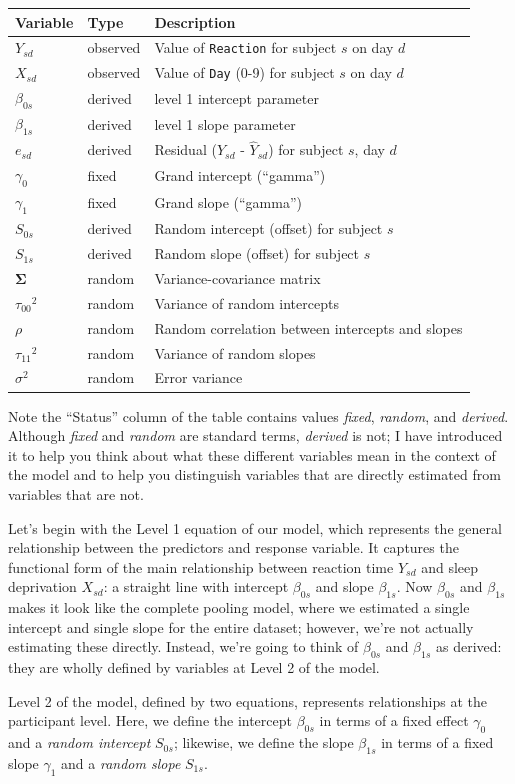 \documentclass[]{book}
\begin{document}
\begin{longtable}[]{@{}lll@{}}
\toprule
Variable & Type & Description\tabularnewline
\midrule
\endhead
\(Y_{sd}\) & observed & Value of \texttt{Reaction} for subject \(s\) on day \(d\)\tabularnewline
\(X_{sd}\) & observed & Value of \texttt{Day} (0-9) for subject \(s\) on day \(d\)\tabularnewline
\(\beta_{0s}\) & derived & level 1 intercept parameter\tabularnewline
\(\beta_{1s}\) & derived & level 1 slope parameter\tabularnewline
\(e_{sd}\) & derived & Residual (\(Y_{sd}\) - \(\hat{Y}_{sd}\)) for subject \(s\), day \(d\)\tabularnewline
\(\gamma_0\) & fixed & Grand intercept (``gamma'')\tabularnewline
\(\gamma_1\) & fixed & Grand slope (``gamma'')\tabularnewline
\(S_{0s}\) & derived & Random intercept (offset) for subject \(s\)\tabularnewline
\(S_{1s}\) & derived & Random slope (offset) for subject \(s\)\tabularnewline
\(\mathbf{\Sigma}\) & random & Variance-covariance matrix\tabularnewline
\({\tau_{00}}^2\) & random & Variance of random intercepts\tabularnewline
\(\rho\) & random & Random correlation between intercepts and slopes\tabularnewline
\({\tau_{11}}^2\) & random & Variance of random slopes\tabularnewline
\(\sigma^2\) & random & Error variance\tabularnewline
\bottomrule
\end{longtable}

Note the ``Status'' column of the table contains values \emph{fixed}, \emph{random}, and \emph{derived}. Although \emph{fixed} and \emph{random} are standard terms, \emph{derived} is not; I have introduced it to help you think about what these different variables mean in the context of the model and to help you distinguish variables that are directly estimated from variables that are not.

Let's begin with the Level 1 equation of our model, which represents the general relationship between the predictors and response variable. It captures the functional form of the main relationship between reaction time \(Y_{sd}\) and sleep deprivation \(X_{sd}\): a straight line with intercept \(\beta_{0s}\) and slope \(\beta_{1s}\). Now \(\beta_{0s}\) and \(\beta_{1s}\) makes it look like the complete pooling model, where we estimated a single intercept and single slope for the entire dataset; however, we're not actually estimating these directly. Instead, we're going to think of \(\beta_{0s}\) and \(\beta_{1s}\) as derived: they are wholly defined by variables at Level 2 of the model.

Level 2 of the model, defined by two equations, represents relationships at the participant level. Here, we define the intercept \(\beta_{0s}\) in terms of a fixed effect \(\gamma_0\) and a \emph{random intercept} \(S_{0s}\); likewise, we define the slope \(\beta_{1s}\) in terms of a fixed slope \(\gamma_1\) and a \emph{random slope} \(S_{1s}\).
\end{document}
